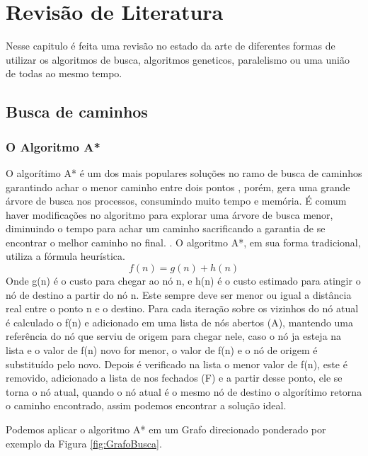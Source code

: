\chapter[Revisão de Literatura]{Revisão de Literatura}


Nesse capitulo é feita uma revisão no estado da arte de diferentes formas de utilizar os algoritmos de busca, algoritmos geneticos, paralelismo ou uma união de todas ao mesmo tempo.

\section{Busca de caminhos}


\subsection{O Algoritmo A*}

O algorítimo A* é um dos mais populares soluções no ramo de busca de caminhos garantindo achar o menor caminho entre dois pontos \cite{PEHart}, porém,  gera uma grande árvore de busca nos processos, consumindo muito tempo e memória. É comum haver modificações no algoritmo para explorar uma árvore de busca menor, diminuindo o tempo para achar um caminho sacrificando a garantia de se encontrar o melhor caminho no final. \cite{Botea}.
O algoritmo A*, em sua forma tradicional, utiliza a fórmula heurística.
\[f(n) = g(n) + h(n)\]
Onde g(n) é o custo para chegar ao nó n, e h(n) é o custo estimado para atingir o nó de destino a partir do nó n. Este sempre deve ser menor ou igual a distância real entre o ponto n e o destino. Para cada iteração sobre os vizinhos do nó atual é calculado o f(n) e adicionado em uma lista de nós abertos (A), mantendo uma referência do nó que serviu de origem para chegar nele, caso o nó ja esteja na lista e o valor de f(n) novo for menor, o valor de f(n) e o nó de origem é substituído pelo novo. Depois é verificado na lista o menor valor de f(n), este é removido, adicionado a lista de nos fechados (F) e a partir desse ponto, ele se torna o nó atual, quando o nó atual é o mesmo nó de destino o algorítimo retorna o caminho encontrado, assim podemos encontrar a solução ideal. \cite{PEHart}

Podemos aplicar o algoritmo A* em um Grafo direcionado ponderado por exemplo da Figura \ref{fig:GrafoBusca}.

